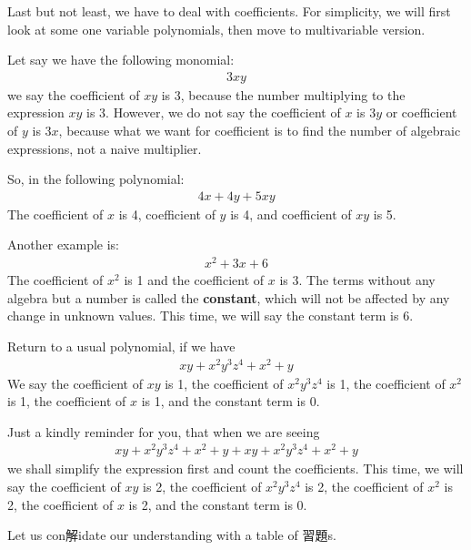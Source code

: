 \documentclass[12pt]{article}
\begin{document}
    Last but not least, we have to deal with coefficients. For simplicity, we will first look at some one variable polynomials, then move to multivariable version.

    Let say we have the following monomial:\begin{align*}
        3xy
    \end{align*} we say the coefficient of $xy$ is 3, because the number multiplying to the expression $xy$ is 3. However, we do not say the coefficient of $x$ is $3y$ or coefficient of $y$ is $3x$, because what we want for coefficient is to find the number of algebraic expressions, not a naive multiplier.

    So, in the following polynomial:\begin{align*}
        4x+4y+5xy
    \end{align*}
    The coefficient of $x$ is 4, coefficient of $y$ is 4, and coefficient of $xy$ is 5.

    Another example is:\begin{align*}
        x^2+3x+6
    \end{align*}
    The coefficient of $x^2$ is 1 and the coefficient of $x$ is 3. The terms without any algebra but a number is called the \textbf{constant}, which will not be affected by any change in unknown values. This time, we will say the constant term is 6.

    Return to a usual polynomial, if we have \begin{align*}
        xy+x^2y^3z^4+x^2+y
    \end{align*}
    We say the coefficient of $xy$ is 1, the coefficient of $x^2y^3z^4$ is 1, the coefficient of $x^2$ is 1, the coefficient of $x$ is 1, and the constant term is 0.

    Just a kindly reminder for you, that when we are seeing \begin{align*}
        xy+x^2y^3z^4+x^2+y+xy+x^2y^3z^4+x^2+y
    \end{align*}
    we shall simplify the expression first and count the coefficients. This time, we will say the coefficient of $xy$ is 2, the coefficient of $x^2y^3z^4$ is 2, the coefficient of $x^2$ is 2, the coefficient of $x$ is 2, and the constant term is 0.

    Let us con解idate our understanding with a table of 習題s.
\end{document}

